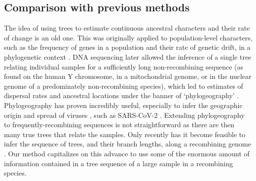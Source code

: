 \documentclass[12pt]{article}
\begin{document}
\subsection*{Comparison with previous methods}

The idea of using trees to estimate continuous ancestral characters and their rate of change is an old one.
This was originally applied to population-level characters, such as the frequency of genes in a population and their rate of genetic drift, in a phylogenetic context \citep{cavalli1964analysis,cavalli1967phylogenetic,edwards1970estimation,felsenstein1973maximum,felsenstein1985phylogenies,grafen1989phylogenetic}.
DNA sequencing later allowed the inference of a single tree relating individual samples for a sufficiently long non-recombining sequence (as found on the human Y chromosome, in a mitochondrial genome, or in the nuclear genome of a predominately non-recombining species), which led to estimates of dispersal rates and ancestral locations under the banner of `phylogeography' 
\citep{avise2009phylogeography,knowles2009statistical}.
Phylogeography has proven incredibly useful, especially to infer the geographic origin and spread of viruses \citep{biek2007high,lemey2009bayesian,lemey2010phylogeography,bedford2010global,volz2013viral}, such as SARS-CoV-2 \citep{worobey2020emergence,lemey2020accommodating,dellicour2021phylodynamic,dellicour2021dispersal,martin2021insights}.
Extending phylogeography to frequently-recombining sequences is not straightforward as there are then many true trees that relate the samples.
Only recently has it become feasible to infer the sequence of trees, and their branch lengths, along a recombining genome \citep{rasmussen2014genome,speidel2019method,wohns2021unified}.
Our method capitalizes on this advance to use some of the enormous amount of information contained in a tree sequence of a large sample in a recombining species.
\end{document}
